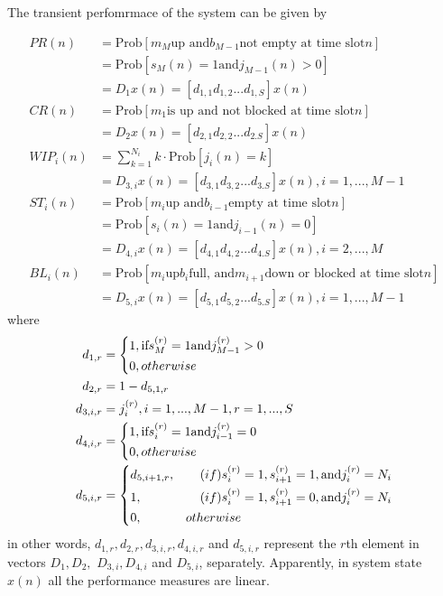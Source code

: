 The transient perfomrmace of the system can be given by

\begin{equation}
    \begin{aligned}
  PR(n) &= \text{Prob}[m_M \text{up and} b_{M-1} \text{not empty at time slot} n] \\
        &= \text{Prob}[s_M(n) = 1 \text{and} j_{M-1}(n) > 0] \\
        &=D_1x(n) = [d_{1,1}d_{1,2}...d_{1,S}]x(n) \\
  CR(n) &= \text{Prob}[m_1 \text{is up and not blocked at time slot} n] \\
        &= D_2x(n) = [d_{2,1}d_{2,2}...d_{2.S}]x(n) \\
WIP_i(n) &=\sum^{N_i}_{k=1}k\cdot \text{Prob}[j_i(n)=k] \\
        &= D_{3,i}x(n) = [d_{3,1}d_{3,2}...d_{3.S}]x(n), i=1,...,M-1 \\
ST_i(n) &=  \text{Prob}[m_i \text{up and} b_{i-1} \text{empty at time slot} n] \\
        &= \text{Prob}[s_i(n) = 1 \text{and} j_{i-1}(n) = 0] \\
        &= D_{4,i}x(n) = [d_{4,1}d_{4,2}...d_{4.S}]x(n), i=2,...,M \\
BL_i(n) &=  \text{Prob}[m_i \text{up} b_{i} \text{full, and} m_{i+1}\text{down or blocked at time slot} n] \\
        &= D_{5,i}x(n) = [d_{5,1}d_{5,2}...d_{5.S}]x(n), i=1,...,M-1
     \end{aligned}
\end{equation}
where
\begin{align*}
    d_{1,r} &= \left\{\begin{aligned}  &1, \text{if}s^{(r)}_M = 1 \text{and} j^{(r)}_{M-1}  > 0 \\ &0, otherwise
    \end{aligned}\right. \\
    d_{2,r} &= 1- d_{5,1,r} \\
    d_{3,i,r} &= j^{(r)}_i, i = 1,...,M-1,  r = 1,...,S \\
    d_{4,i,r} &= \left\{\begin{aligned} &1, \text{if} s^{(r)}_i = 1 \text{and} j^{(r)}_{i-1}=0 \\ &0 , otherwise
    \end{aligned}\right. \\
    d_{5,i,r} &= \left\{\begin{aligned} & d_{5,i+1,r},  &\text(if) s^{(r)}_i &=1,s^{(r)}_{i+1} =1, \text{and} j^{(r)}_i = N_i \\  & 1,  &\text(if) s^{(r)}_i &=1,s^{(r)}_{i+1} =0, \text{and} j^{(r)}_i = N_i \\ & 0, &otherwise
    \end{aligned}\right.
  \end{align*}
  in other words, $d_{1,r},d_{2,r}, d_{3,i,r}, d_{4,i,r}$ and $d_{5,i,r}$ represent the $r$th element in vectors $D_1,D_2,$ $D_{3,i},D_{4,i}$ and $D_{5,i}$, separately. Apparently, in system state $x(n)$ all the performance measures are linear.

